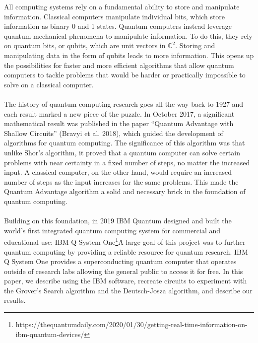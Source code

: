 \documentclass[12pt]{article}
\newcommand{\ibm}{\footnote{https://thequantumdaily.com/2020/01/30/getting-real-time-information-on-ibm-quantum-devices/}}
\begin{document}
    
    \noindent
    All computing systems rely on a fundamental ability to store and manipulate information. Classical computers manipulate individual bits, which store information as binary 0 and 1 states. Quantum computers instead leverage quantum mechanical phenomena to manipulate information. To do this, they rely on quantum bits, or qubits, which are unit vectors in $\mathbb{C}^2$. Storing and manipulating data in the form of qubits leads to more information. This opens up the possibilities for faster and more efficient algorithms that allow quantum computers to tackle problems that would be harder or practically impossible to solve on a classical computer.
    \\
    \smallskip
    \\
    The history of quantum computing research goes all the way back to 1927 and each result marked a new piece of the puzzle. In October 2017, a significant mathematical result was published in the paper “Quantum Advantage with Shallow Circuits” (Bravyi et al. 2018), which guided the development of algorithms for quantum computing. The significance of this algorithm was that unlike Shor’s algorithm, it proved that a quantum computer can solve certain problems with near certainty in a fixed number of steps, no matter the increased input. A classical computer, on the other hand,  would require an increased number of steps as the input increases for the same problems. This made the Quantum Advantage algorithm a solid and necessary brick in the foundation of quantum computing.
    \\
    \smallskip
    \\
    Building on this foundation, in 2019 IBM Quantum designed and built the world’s first integrated quantum computing system for commercial and educational use: IBM Q System One\ibm\. A large goal of this project was to further quantum computing by providing a reliable resource for quantum research. IBM Q System One provides a superconducting quantum computer that operates outside of research labs allowing the general public to access it for free. In this paper, we describe using the IBM software, recreate circuits to experiment with the Grover’s Search algorithm and the Deutsch-Josza algorithm, and describe our results.
\end{document}
